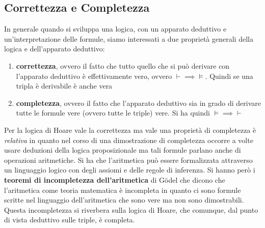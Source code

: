 				      				\subsection{Correttezza e Completezza}
				      				In generale quando si sviluppa una logica, con un apparato deduttivo e
				      				un'interpretazione delle formule, siamo interessati a due proprietà generali
				      				della logica e dell'apparato deduttivo:
				      				\begin{enumerate}
				      					\item \textbf{correttezza}, ovvero il fatto che tutto quello che si può
				      					      derivare con l'apparato deduttivo è effettivamente vero, ovvero
				      					      $\vdash\implies\vDash$. Quindi se una tripla è derivabile è anche vera
				      					\item \textbf{completezza}, ovvero il fatto che l'apparato deduttivo sia in
				      					      grado di derivare tutte le formule vere (ovvero tutte le triple) vere. Si ha
				      					      quindi $\vDash\implies\vdash$
				      				\end{enumerate}
				      				Per la logica di Hoare vale la correttezza ma vale una proprietà di completezza
				      				è \textit{relativa} in quanto nel corso di una dimostrazione di completezza
				      				occorre a volte usare deduzioni della logica proposizionale ma tali formule
				      				parlano anche di operazioni aritmetiche. Si ha che l'aritmetica può essere
				      				formalizzata attraverso un linguaggio logico con degli assiomi e delle regole di
				      				inferenza. Si hanno però i \textbf{teoremi di incompletezza dell'aritmetica} di
				      				G\"{o}del che dicono che l'aritmetica come teoria matematica è incompleta in
				      				quanto ci sono formule scritte nel linguaggio dell'aritmetica che sono vere ma
				      				non sono dimostrabili. Questa incompletezza si riverbera sulla logica di Hoare,
				      				che comunque, dal punto di vista deduttivo sulle triple, è completa.
